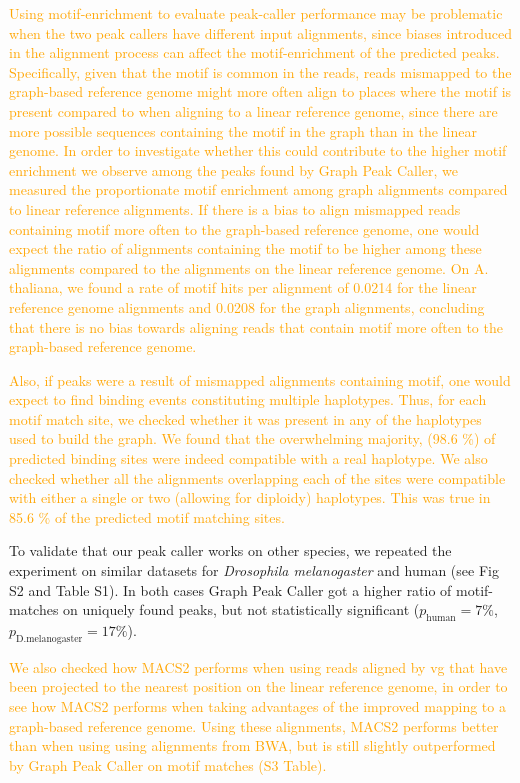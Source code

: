 \documentclass[10pt,letterpaper]{article}
\newcommand{\revision}[1]{\textcolor{orange}{#1}}
\begin{document}
\revision{Using motif-enrichment to evaluate peak-caller performance may be problematic when the two peak callers have different input alignments, since biases introduced in the alignment process can affect the motif-enrichment of the predicted peaks. Specifically, given that the motif is common in the reads, reads mismapped to the graph-based reference genome might more often align to places where the motif is present compared to when aligning to a linear reference genome, since there are more possible sequences containing the motif in the graph than in the linear genome. In order to investigate whether this could contribute to the higher motif enrichment we observe among the peaks found by Graph Peak Caller, we measured the proportionate motif enrichment among graph alignments compared to linear reference alignments. If there is a bias to align mismapped reads containing motif more often to the graph-based reference genome, one would expect the ratio of alignments containing the motif to be higher among these alignments compared to the alignments on the linear reference genome. On A. thaliana, we found a rate of motif hits per alignment of 0.0214 for the linear reference genome alignments and 0.0208 for the graph alignments, concluding that there is no bias towards aligning reads that contain motif more often to the graph-based reference genome.}

\revision{Also, if peaks were a result of mismapped alignments containing motif, one would expect to find binding events constituting multiple haplotypes. Thus, for each motif match site, we checked whether it was present in any of the haplotypes used to build the graph. We found that the overwhelming majority, (98.6 \%) of predicted binding sites were indeed compatible with a real haplotype. We also checked whether all the alignments overlapping each of the sites were compatible with either a single or two (allowing for diploidy) haplotypes. This was true in 85.6 \% of the predicted motif matching sites.} 


To validate that our peak caller works on other species, we repeated the experiment on similar datasets for \emph{Drosophila melanogaster } and human (see Fig S2 and Table S1). In both cases Graph Peak Caller got a higher ratio of motif-matches on uniquely found peaks, but not statistically significant ($p_{\text{human}}=7\%$, $p_{\text{D.melanogaster}}=17\%$).


\revision{We also checked how MACS2 performs when using reads aligned by vg that have been projected to the nearest position on the linear reference genome, in order to see how MACS2 performs when taking advantages of the improved mapping to a graph-based reference genome. Using these alignments, MACS2 performs better than when using using alignments from BWA, but is still slightly outperformed by Graph Peak Caller on motif matches (S3 Table).}
\end{document}
